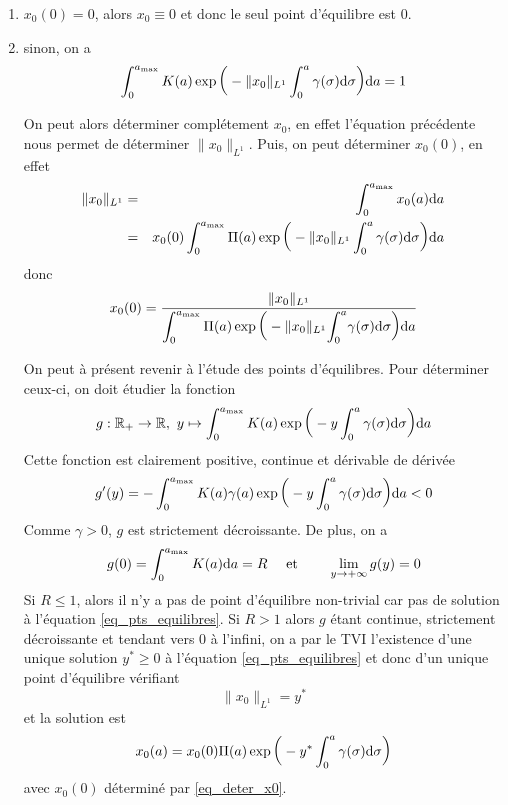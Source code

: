 \begin{enumerate}
    \item $x_0(0)=0$, alors $x_0\equiv 0$ et donc le seul point d'équilibre est $0$.
    \item sinon, on a 
    \begin{equation}\label{eq_pts_equilibres}
        \int_0^{a_{\max}}K(a)\exp\bigg(-\|x_0\|_{L^1}\int_0^a\gamma(\sigma)\mathrm{d} \sigma\bigg)\mathrm{d} a = 1
    \end{equation}
    \begin{remark}
        On peut alors déterminer complétement $x_0$, en effet l'équation précédente nous permet de déterminer $\|x_0\|_{L^1}$. Puis, on peut déterminer $x_0(0)$, en effet 
        \begin{eqnarray*}
            \|x_0\|_{L^1} &=& \int_0^{a_{\max}} x_0(a)\mathrm{d} a \\
            &=& x_0(0) \int_0^{a_{\max}} \Pi(a)\exp\bigg(-\|x_0\|_{L^1}\int_0^a\gamma(\sigma)\mathrm{d}\sigma\bigg)\mathrm{d} a
        \end{eqnarray*}
        donc 
        \begin{equation}\label{eq_deter_x0}
            x_0(0) = \frac{\|x_0\|_{L^1}}{\displaystyle{\int_0^{a_{\max}}\Pi(a)\exp\bigg(-\|x_0\|_{L^1}\displaystyle{\int_0^a}\gamma(\sigma)\mathrm{d}\sigma\bigg)\mathrm{d}a}}
        \end{equation}
    \end{remark}
    On peut à présent revenir à l'étude des points d'équilibres. Pour déterminer ceux-ci, on doit étudier la fonction 
    \begin{equation*}
        g : \mathbb{R}_+ \rightarrow \mathbb{R}, \ y \mapsto \int_0^{a_{\max}}K(a)\exp\bigg(-y\int_0^a\gamma(\sigma)\mathrm{d} \sigma\bigg)\mathrm{d} a
    \end{equation*}
    Cette fonction est clairement positive, continue et dérivable de dérivée 
    \begin{equation*}
        g'(y) = -\int_0^{a_{\max}}K(a)\gamma(a)\exp\bigg(-y\int_0^a\gamma(\sigma)\mathrm{d} \sigma\bigg)\mathrm{d} a < 0
    \end{equation*}
    Comme $\gamma > 0$, $g$ est strictement décroissante. De plus, on a 
    \begin{eqnarray*}
        g(0) = \int_0^{a_{\max}}K(a)\mathrm{d} a = R \ \ \ &\text{ et }& \ \ \ \lim_{y \to +\infty}g(y) = 0
    \end{eqnarray*}
    Si $R\leq1$, alors il n'y a pas de point d'équilibre non-trivial car pas de solution à l'équation \eqref{eq_pts_equilibres}. Si $R > 1$ alors $g$ étant continue, strictement décroissante et tendant vers $0$ à l'infini, on a par le TVI l'existence d'une unique solution $y^*\geq 0$ à l'équation \eqref{eq_pts_equilibres} et donc d'un unique point d'équilibre vérifiant
    \begin{equation*}
        \|x_0\|_{L^1}=y^*
    \end{equation*}
    et la solution est 
    \begin{equation*}
        x_0(a)=x_0(0)\Pi(a)\exp\bigg(-y^*\int_0^a\gamma(\sigma)\mathrm{d} \sigma\bigg)
    \end{equation*}
    avec $x_0(0)$ déterminé par \eqref{eq_deter_x0}.
\end{enumerate}

